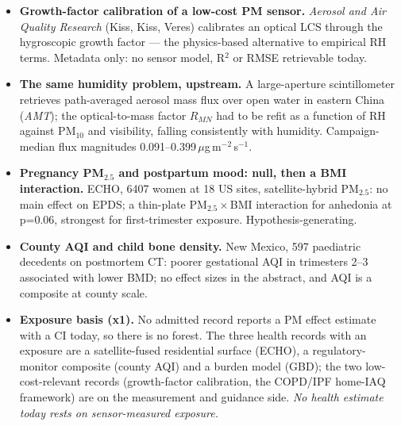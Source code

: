 \documentclass[10pt]{article}
\begin{document}
\footnotesize
\begin{itemize}

\item \textbf{Growth-factor calibration of a low-cost PM sensor.} \textit{Aerosol and Air Quality Research} (Kiss, Kiss, Veres) calibrates an optical LCS through the hygroscopic growth factor --- the physics-based alternative to empirical RH terms. Metadata only: no sensor model, R$^2$ or RMSE retrievable today.

\item \textbf{The same humidity problem, upstream.} A large-aperture scintillometer retrieves path-averaged aerosol mass flux over open water in eastern China (\textit{AMT}); the optical-to-mass factor $R_{MN}$ had to be refit as a function of RH against PM$_{10}$ and visibility, falling consistently with humidity. Campaign-median flux magnitudes 0.091--0.399\,$\mu$g\,m$^{-2}$\,s$^{-1}$.

\item \textbf{Pregnancy PM$_{2.5}$ and postpartum mood: null, then a BMI interaction.} ECHO, 6407 women at 18 US sites, satellite-hybrid PM$_{2.5}$: no main effect on EPDS; a thin-plate PM$_{2.5}\times$BMI interaction for anhedonia at p=0.06, strongest for first-trimester exposure. Hypothesis-generating.

\item \textbf{County AQI and child bone density.} New Mexico, 597 paediatric decedents on postmortem CT: poorer gestational AQI in trimesters 2--3 associated with lower BMD; no effect sizes in the abstract, and AQI is a composite at county scale.

\item \textbf{Exposure basis (x1).} No admitted record reports a PM effect estimate with a CI today, so there is no forest. The three health records with an exposure are a satellite-fused residential surface (ECHO), a regulatory-monitor composite (county AQI) and a burden model (GBD); the two low-cost-relevant records (growth-factor calibration, the COPD/IPF home-IAQ framework) are on the measurement and guidance side. \emph{No health estimate today rests on sensor-measured exposure.}

\end{itemize}

\vspace{2mm}
\end{document}
